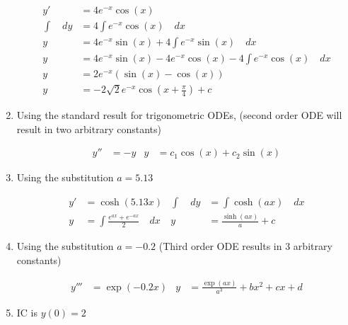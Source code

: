 \begin{enumerate}
          \begin{align}
              y'            & = 4 e^{-x} \cos(x)                                      \\
              \int \quad dy & = 4 \int e^{-x} \cos(x) \quad dx                        \\
              y             & = 4 e^{-x} \sin(x)  + 4 \int e^{-x} \sin(x) \quad dx    \\
              y             & = 4 e^{-x} \sin(x)  - 4 e^{-x} \cos(x) - 4 \int e^{-x}
              \cos(x) \quad dx                                                        \\
              y             & = 2 e^{-x} (\sin(x) - \cos(x))                          \\
              y             & = -2 \sqrt{2} e^{-x} \cos\left(x + \frac{\pi}{4}\right)
              + c
          \end{align}


    \item Using the standard result for trigonometric ODEs, (second order ODE will result
          in two arbitrary constants)

          \begin{align}
              y'' & = -y                            &
              y   & = c_{1} \cos(x) + c_{2} \sin(x)
          \end{align}


    \item Using the substitution $a  = 5.13$

          \begin{align}
              y'            & = \cosh(5.13 x)                             &
              \int \quad dy & = \int \cosh(a x)  \quad dx                   \\
              y             & = \int \frac{e^{ax} + e^{-ax}}{2}  \quad dx &
              y             & = \frac{\sinh(ax)}{a} + c
          \end{align}


    \item Using the substitution $a  = -0.2$ (Third order ODE results in 3 arbitrary
          constants)

          \begin{align}
              y''' & = \exp(-0.2x)                              &
              y    & = \frac{\exp(ax)}{a^{3}} + bx^{2} + cx + d
          \end{align}


    \item IC is $y(0) = 2$


\end{enumerate}
